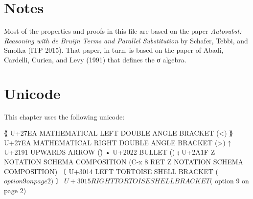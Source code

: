 \hypertarget{notes}{%
\section{Notes}\label{notes}}

Most of the properties and proofs in this file are based on the paper
\emph{Autosubst: Reasoning with de Bruijn Terms and Parallel
Substitution} by Schafer, Tebbi, and Smolka (ITP 2015). That paper, in
turn, is based on the paper of Abadi, Cardelli, Curien, and Levy (1991)
that defines the σ algebra.

\hypertarget{unicode}{%
\section{Unicode}\label{unicode}}

This chapter uses the following unicode:

\begin{myDisplay}
⟪  U+27EA  MATHEMATICAL LEFT DOUBLE ANGLE BRACKET (\<<)
⟫  U+27EA  MATHEMATICAL RIGHT DOUBLE ANGLE BRACKET (\>>)
↑  U+2191  UPWARDS ARROW (\u)
•  U+2022  BULLET (\bub)
⨟  U+2A1F  Z NOTATION SCHEMA COMPOSITION (C-x 8 RET Z NOTATION SCHEMA COMPOSITION)
〔  U+3014  LEFT TORTOISE SHELL BRACKET (\( option 9 on page 2)
〕  U+3015  RIGHT TORTOISE SHELL BRACKET (\) option 9 on page 2)
\end{myDisplay}

